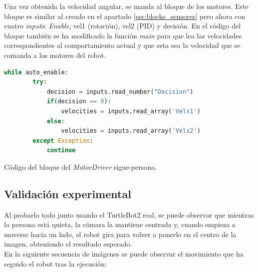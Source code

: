 Una vez obtenida la velocidad angular, se manda al bloque de los motores. Este bloque es similar al creado en el apartado
\ref{sec:blocks_sensores} pero ahora con cuatro \textit{inputs}: \textit{Enable}, vel1 (rotación), vel2 (PID) y decisión.
En el código del bloque también se ha modificado la función \textit{main} para que lea las velocidades correspondientes al comportamiento actual y
que esta sea la velocidad que se comanda a los motores del robot.\\

\begin{code}[H]
    \begin{lstlisting}[language=python]
    while auto_enable:
        try:
            decision = inputs.read_number("Decision")
            if(decision == 0):
                velocities = inputs.read_array('Vels1')
            else:
                velocities = inputs.read_array('Vels2')
        except Exception:
            continue
\end{lstlisting}
\caption[Código bloque MotorDriver sigue-persona]{Código del bloque del \textit{MotorDriver} sigue-persona.}
\label{cod:MotorDriver_FP}
\end{code}

\subsection{Validación experimental}
\label{subsec:FP1_val}

Al probarlo todo junto usando el TurtleBot2 real, se puede observar que mientras la persona está quieta, la cámara la mantiene centrada y,
cuando empieza a moverse hacia un lado, el robot gira para volver a ponerlo en el centro de la imagen, obteniendo el resultado esperado.\\

En la siguiente secuencia de imágenes se puede observar el movimiento que ha seguido el robot tras la ejecución:

